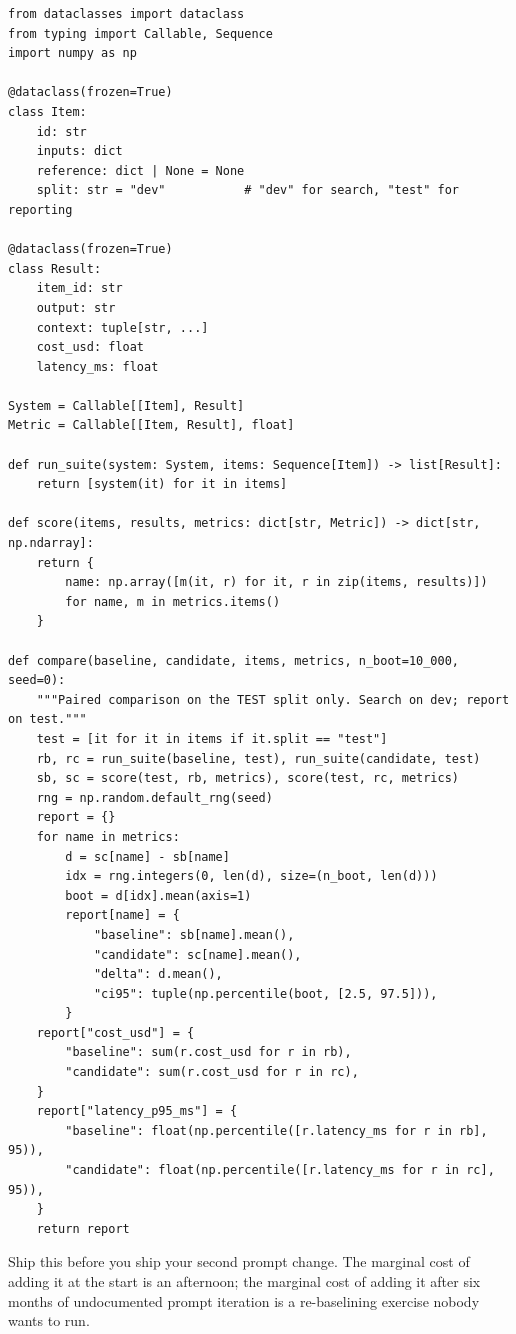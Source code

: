 \documentclass[11pt,twoside,openright]{book}
\theoremstyle{definition}
\theoremstyle{plain}
\theoremstyle{remark}
\newcommand{\code}[1]{\texttt{\small #1}}
\begin{document}
\begin{lstlisting}[style=py, caption={Harness skeleton. Everything vendor-specific
lives behind \code{System.run}.}]
from dataclasses import dataclass
from typing import Callable, Sequence
import numpy as np

@dataclass(frozen=True)
class Item:
    id: str
    inputs: dict
    reference: dict | None = None
    split: str = "dev"           # "dev" for search, "test" for reporting

@dataclass(frozen=True)
class Result:
    item_id: str
    output: str
    context: tuple[str, ...]
    cost_usd: float
    latency_ms: float

System = Callable[[Item], Result]
Metric = Callable[[Item, Result], float]

def run_suite(system: System, items: Sequence[Item]) -> list[Result]:
    return [system(it) for it in items]

def score(items, results, metrics: dict[str, Metric]) -> dict[str, np.ndarray]:
    return {
        name: np.array([m(it, r) for it, r in zip(items, results)])
        for name, m in metrics.items()
    }

def compare(baseline, candidate, items, metrics, n_boot=10_000, seed=0):
    """Paired comparison on the TEST split only. Search on dev; report on test."""
    test = [it for it in items if it.split == "test"]
    rb, rc = run_suite(baseline, test), run_suite(candidate, test)
    sb, sc = score(test, rb, metrics), score(test, rc, metrics)
    rng = np.random.default_rng(seed)
    report = {}
    for name in metrics:
        d = sc[name] - sb[name]
        idx = rng.integers(0, len(d), size=(n_boot, len(d)))
        boot = d[idx].mean(axis=1)
        report[name] = {
            "baseline": sb[name].mean(),
            "candidate": sc[name].mean(),
            "delta": d.mean(),
            "ci95": tuple(np.percentile(boot, [2.5, 97.5])),
        }
    report["cost_usd"] = {
        "baseline": sum(r.cost_usd for r in rb),
        "candidate": sum(r.cost_usd for r in rc),
    }
    report["latency_p95_ms"] = {
        "baseline": float(np.percentile([r.latency_ms for r in rb], 95)),
        "candidate": float(np.percentile([r.latency_ms for r in rc], 95)),
    }
    return report
\end{lstlisting}

\begin{practice}
Ship this before you ship your second prompt change. The marginal cost of adding
it at the start is an afternoon; the marginal cost of adding it after six months
of undocumented prompt iteration is a re-baselining exercise nobody wants to run.
\end{practice}
\end{document}
